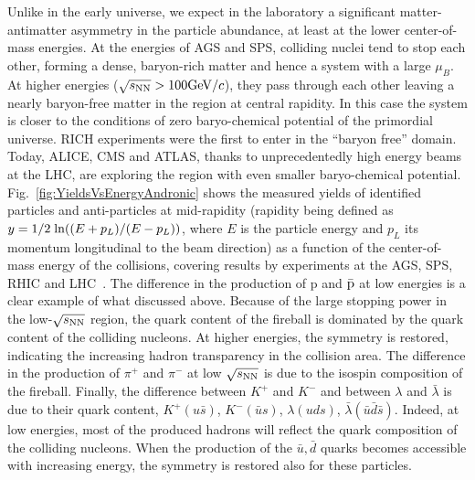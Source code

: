 Unlike in the early universe, we expect in the laboratory a significant matter-antimatter asymmetry in the particle abundance, at least at the lower center-of-mass energies. 
At the energies of AGS and SPS, colliding nuclei tend to stop each other, forming a dense, baryon-rich matter and hence a system with a large $\mu_{B}$. At higher energies ($\sqrt{s_{\rm NN}} > 100 \mathrm{GeV}/c$), they pass through each other leaving a nearly baryon-free matter in the region at central rapidity. In this case the system is closer to the conditions of zero baryo-chemical potential of the primordial universe. RICH experiments were the first to enter in the  ``baryon free'' domain. Today, ALICE, CMS and ATLAS, thanks to unprecedentedly high energy beams at the LHC, are exploring the region with even smaller baryo-chemical potential. Fig.~\ref{fig:YieldsVsEnergyAndronic} shows the measured yields of identified particles and anti-particles at mid-rapidity (rapidity being defined as \mbox{$y = 1/2 \; {\rm ln}((E+p_{L})/(E-p_{L}))$}, where $E$ is the particle energy and $p_{L}$ its momentum longitudinal to the beam direction) as a function of the center-of-mass energy of the collisions, covering results by experiments at the AGS, SPS, RHIC and LHC~\cite{Andronic:2014zha}. The difference in the production of p and $\bar{\rm p}$ at low energies is a clear example of what discussed above. Because of the large stopping power in the low-$\sqrt{s_{\rm NN}}$ region, the quark content of the fireball is dominated by the quark content of the colliding nucleons. At higher energies, the symmetry is restored, indicating the increasing hadron transparency in the collision area. 
The difference in the production of $\pi^+$ and $\pi^-$ at low $\sqrt{s_{\rm NN}}$ is due to the isospin composition of the fireball. Finally, the difference between $K^+$ and $K^-$ and between $\lambda$ and $\bar{\lambda}$ is due to their quark content, $K^+ (u\bar{s})$, $K^- (\bar{u}s)$, $\lambda (uds)$, $\bar{\lambda} (\bar
{u}\bar{d}\bar{s})$. Indeed, at low energies, most of the produced hadrons will reflect the quark composition of the colliding nucleons. When the production of the $\bar{u}, \bar{d}$ quarks becomes accessible with increasing energy, the symmetry is restored also for these particles.
